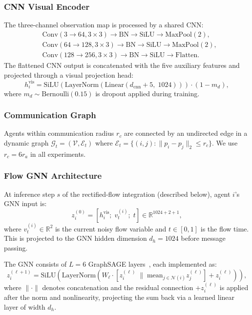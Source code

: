\subsubsection{CNN Visual Encoder}

The three-channel observation map is processed by a shared CNN:
\begin{align*}
  &\text{Conv}(3 \to 64, 3\!\times\!3) \to \text{BN} \to \text{SiLU} \to \text{MaxPool}(2), \\
  &\text{Conv}(64 \to 128, 3\!\times\!3) \to \text{BN} \to \text{SiLU} \to \text{MaxPool}(2), \\
  &\text{Conv}(128 \to 256, 3\!\times\!3) \to \text{BN} \to \text{SiLU} \to \text{Flatten}.
\end{align*}
The flattened CNN output is concatenated with the five auxiliary features and projected through a visual projection head:
\[
  h_i^{\text{vis}} = \text{SiLU}(\text{LayerNorm}(\text{Linear}(d_{\text{cnn}}+5,\; 1024))) \cdot (1 - m_d),
\]
where $m_d \sim \text{Bernoulli}(0.15)$ is dropout applied during training.

\subsubsection{Communication Graph}

Agents within communication radius $r_c$ are connected by an undirected edge in a dynamic graph $\mathcal{G}_t = (\mathcal{V}, \mathcal{E}_t)$ where $\mathcal{E}_t = \{(i,j) : \|p_i - p_j\|_2 \leq r_c\}$. We use $r_c = 6r_a$ in all experiments.

\subsubsection{Flow GNN Architecture}

At inference step $s$ of the rectified-flow integration (described below), agent $i$'s GNN input is:
\[
  z_i^{(0)} = [h_i^{\text{vis}};\; v_t^{(i)};\; t] \in \mathbb{R}^{1024 + 2 + 1},
\]
where $v_t^{(i)} \in \mathbb{R}^2$ is the current noisy flow variable and $t \in [0,1]$ is the flow time. This is projected to the GNN hidden dimension $d_h = 1024$ before message passing.

The GNN consists of $L=6$ GraphSAGE layers~\cite{hamilton2017graphsage}, each implemented as:
\[
  z_i^{(\ell+1)} = \text{SiLU}\left(\text{LayerNorm}\left(W_\ell \cdot \left[z_i^{(\ell)} \;\|\; \text{mean}_{j \in \mathcal{N}(i)} z_j^{(\ell)}\right] + z_i^{(\ell)}\right)\right),
\]
where $\|\cdot\|$ denotes concatenation and the residual connection $+z_i^{(\ell)}$ is applied after the norm and nonlinearity, projecting the sum back via a learned linear layer of width $d_h$.

